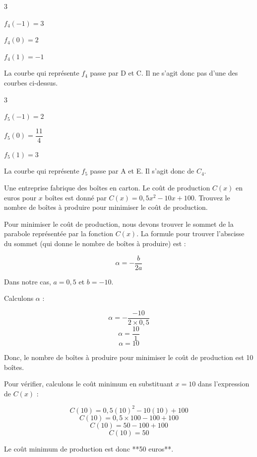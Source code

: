 \documentclass[11pt,a4paper]{article}  %
\begin{document}
\begin{corrBox}
\begin{enumMet}
\begin{multicols}{3}
			\begin{itemMet}
				\item $f_4(-1)=3$
				\item $f_4(0)=2$
				\item $f_4(1)=-1$
			\end{itemMet}
		\end{multicols}
		La courbe qui représente $f_4$ passe par D et C. Il ne s'agit donc pas d'une des courbes ci-dessus.
		\item 
		\begin{multicols}{3}
			\begin{itemMet}
				\item $f_5(-1)=2$
				\item $f_5(0)=\dfrac{11}{4}$
				\item $f_5(1)=3$
			\end{itemMet}
		\end{multicols}
		La courbe qui représente $f_5$ passe par A et E. Il s'agit donc de $C_4$.
	\end{enumMet}
\end{corrBox}

\exercice{}

Une entreprise fabrique des boîtes en carton. Le coût de production \( C(x) \) en euros pour \( x \) boîtes est donné par \( C(x) = 0,5x^2 - 10x + 100 \). Trouvez le nombre de boîtes à produire pour minimiser le coût de production.
	\begin{corrBox}
		Pour minimiser le coût de production, nous devons trouver le sommet de la parabole représentée par la fonction \( C(x) \). La formule pour trouver l'abscisse du sommet (qui donne le nombre de boîtes à produire) est :
		
		\[ \alpha = -\frac{b}{2a} \]
		
		Dans notre cas, \( a = 0,5 \) et \( b = -10 \).
		
		Calculons \( \alpha \) :
		
		\[ \alpha = -\frac{-10}{2 \times 0,5} \]
		\[ \alpha = \frac{10}{1} \]
		\[ \alpha = 10 \]
		
		Donc, le nombre de boîtes à produire pour minimiser le coût de production est 10 boîtes.
		
		Pour vérifier, calculons le coût minimum en substituant \( x = 10 \) dans l'expression de \( C(x) \) :
		
		\[ C(10) = 0,5(10)^2 - 10(10) + 100 \]
		\[ C(10) = 0,5 \times 100 - 100 + 100 \]
		\[ C(10) = 50 - 100 + 100 \]
		\[ C(10) = 50 \]
		
		Le coût minimum de production est donc **50 euros**.
	\end{corrBox}
\end{document}
